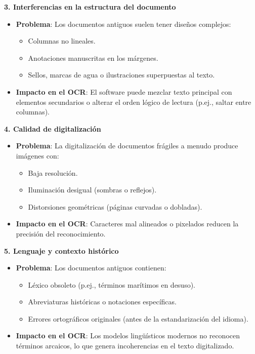 \textbf{3. Interferencias en la estructura del documento}
\begin{itemize}
	\item \textbf{Problema}:  
	Los documentos antiguos suelen tener diseños complejos:  
	\begin{itemize}
		\item Columnas no lineales.  
		\item Anotaciones manuscritas en los márgenes.  
		\item Sellos, marcas de agua o ilustraciones superpuestas al texto.  
	\end{itemize}
	
	\item \textbf{Impacto en el OCR}:  
	El software puede mezclar texto principal con elementos secundarios o alterar el orden lógico de lectura (p.ej., saltar entre columnas).
\end{itemize}

\textbf{4. Calidad de digitalización}
\begin{itemize}
	\item \textbf{Problema}:  
	La digitalización de documentos frágiles a menudo produce imágenes con:  
	\begin{itemize}
		\item Baja resolución.  
		\item Iluminación desigual (sombras o reflejos).  
		\item Distorsiones geométricas (páginas curvadas o dobladas).  
	\end{itemize}
	
	\item \textbf{Impacto en el OCR}:  
	Caracteres mal alineados o pixelados reducen la precisión del reconocimiento.
\end{itemize}

\textbf{5. Lenguaje y contexto histórico}
\begin{itemize}
	\item \textbf{Problema}:  
	Los documentos antiguos contienen:  
	\begin{itemize}
		\item Léxico obsoleto (p.ej., términos marítimos en desuso).  
		\item Abreviaturas históricas o notaciones específicas.  
		\item Errores ortográficos originales (antes de la estandarización del idioma).  
	\end{itemize}
	
	\item \textbf{Impacto en el OCR}:  
	Los modelos lingüísticos modernos no reconocen términos arcaicos, lo que genera incoherencias en el texto digitalizado.
\end{itemize}

